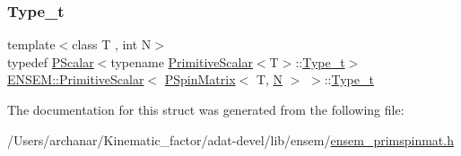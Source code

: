\mbox{\label{structENSEM_1_1PrimitiveScalar_3_01PSpinMatrix_3_01T_00_01N_01_4_01_4_a90fbf3041c0d06689dfb63b1e61955f9}} 
\subsubsection{\texorpdfstring{Type\_t}{Type\_t}\hspace{0.1cm}{\footnotesize\ttfamily [3/3]}}
{\footnotesize\ttfamily template$<$class T , int N$>$ \\
typedef \mbox{\hyperlink{classENSEM_1_1PScalar}{P\+Scalar}}$<$typename \mbox{\hyperlink{structENSEM_1_1PrimitiveScalar}{Primitive\+Scalar}}$<$T$>$\+::\mbox{\hyperlink{structENSEM_1_1PrimitiveScalar_3_01PSpinMatrix_3_01T_00_01N_01_4_01_4_a90fbf3041c0d06689dfb63b1e61955f9}{Type\+\_\+t}}$>$ \mbox{\hyperlink{structENSEM_1_1PrimitiveScalar}{E\+N\+S\+E\+M\+::\+Primitive\+Scalar}}$<$ \mbox{\hyperlink{classENSEM_1_1PSpinMatrix}{P\+Spin\+Matrix}}$<$ T, \mbox{\hyperlink{adat__devel_2lib_2hadron_2operator__name__util_8cc_a7722c8ecbb62d99aee7ce68b1752f337}{N}} $>$ $>$\+::\mbox{\hyperlink{structENSEM_1_1PrimitiveScalar_3_01PSpinMatrix_3_01T_00_01N_01_4_01_4_a90fbf3041c0d06689dfb63b1e61955f9}{Type\+\_\+t}}}



The documentation for this struct was generated from the following file\+:\begin{DoxyCompactItemize}
\item 
/\+Users/archanar/\+Kinematic\+\_\+factor/adat-\/devel/lib/ensem/\mbox{\hyperlink{adat-devel_2lib_2ensem_2ensem__primspinmat_8h}{ensem\+\_\+primspinmat.\+h}}\end{DoxyCompactItemize}
